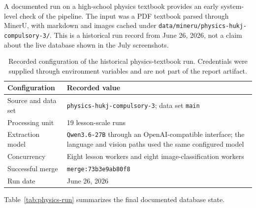 \documentclass[11pt,letterpaper]{article}
\newcommand{\code}[1]{\nolinkurl{#1}}
\begin{document}
A documented run on a high-school physics textbook provides an early system-level check of the pipeline. The input was a PDF textbook parsed through MinerU, with markdown and images cached under \code{data/mineru/physics-hukj-compulsory-3/}. This is a historical run record from June 26, 2026, not a claim about the live database shown in the July screenshots.

\begin{table}[H]
\centering
\small
\begin{tabularx}{0.92\textwidth}{@{}lY@{}}
\toprule
\textbf{Configuration} & \textbf{Recorded value}\\
\midrule
Source and data set & \code{physics-hukj-compulsory-3}; data set \code{main}\\
Processing unit & 19 lesson-scale runs\\
Extraction model & \code{Qwen3.6-27B} through an OpenAI-compatible interface; the language and vision paths used the same configured model\\
Concurrency & Eight lesson workers and eight image-classification workers\\
Successful merge & \code{merge:73b3e9ab80f8}\\
Run date & June 26, 2026\\
\bottomrule
\end{tabularx}
\caption{Recorded configuration of the historical physics-textbook run. Credentials were supplied through environment variables and are not part of the report artifact.}
\label{tab:physics-run-config}
\end{table}

Table~\ref{tab:physics-run} summarizes the final documented database state.
\end{document}
